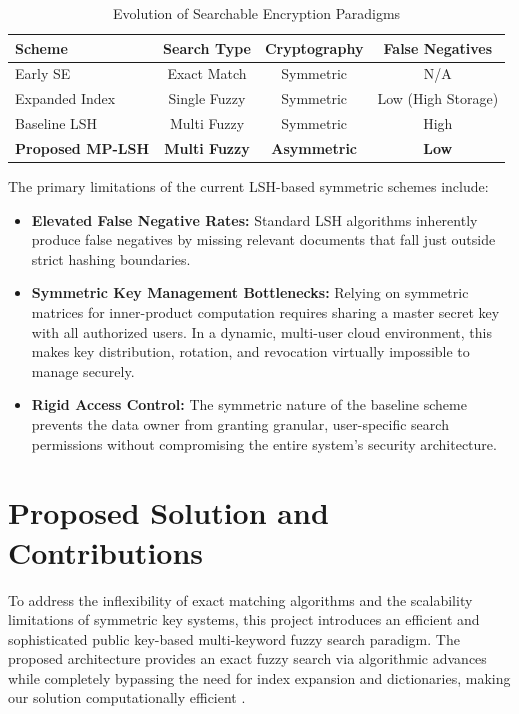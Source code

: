 \begin{table}[h]
    \caption{Evolution of Searchable Encryption Paradigms}
    \centering
    \begin{tabular}{||l c c c||} 
        \hline
        Scheme & Search Type & Cryptography & False Negatives \\ [0.5ex] 
        \hline\hline
        Early SE \cite{song2000practical} & Exact Match & Symmetric & N/A \\ 
        Expanded Index \cite{li2010fuzzy} & Single Fuzzy & Symmetric & Low (High Storage) \\
        Baseline LSH \cite{wang2014privacy} & Multi Fuzzy & Symmetric & High \\
        \textbf{Proposed MP-LSH} & \textbf{Multi Fuzzy} & \textbf{Asymmetric} & \textbf{Low} \\ [1ex] 
        \hline
    \end{tabular}
\end{table}

The primary limitations of the current LSH-based symmetric schemes include:
\begin{itemize}
    \item \textbf{Elevated False Negative Rates:} Standard LSH algorithms inherently produce false negatives by missing relevant documents that fall just outside strict hashing boundaries.%
    \item \textbf{Symmetric Key Management Bottlenecks:} Relying on symmetric matrices for inner-product computation requires sharing a master secret key with all authorized users. In a dynamic, multi-user cloud environment, this makes key distribution, rotation, and revocation virtually impossible to manage securely.
    \item \textbf{Rigid Access Control:} The symmetric nature of the baseline scheme prevents the data owner from granting granular, user-specific search permissions without compromising the entire system's security architecture.
\end{itemize}

\section{Proposed Solution and Contributions}
To address the inflexibility of exact matching algorithms and the scalability limitations of symmetric key systems, this project introduces an efficient and sophisticated public key-based multi-keyword fuzzy search paradigm. The proposed architecture provides an exact fuzzy search via algorithmic advances while completely bypassing the need for index expansion and dictionaries, making our solution computationally efficient \cite{wang2014privacy}.

